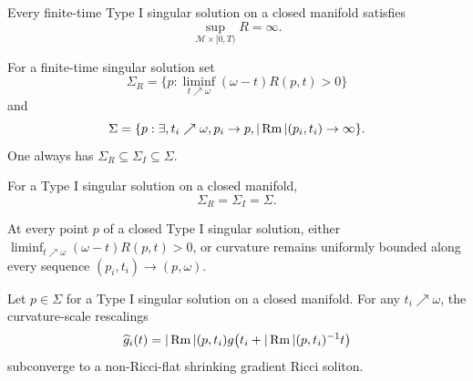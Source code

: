 \begin{theorem}
\label{thm:chow-iv-type-i-singular-scalar-curvature-unbounded}
Every finite-time Type I singular solution on a closed manifold satisfies
\[
 \sup_{\mathcal M\times[0,T)}R=\infty.
\]
\end{theorem}

\begin{definition}
\label{def:chow-iv-singular-point-sets}
For a finite-time singular solution set
\[
 \Sigma_R=\{p:\liminf_{t\nearrow\omega}(\omega-t)R(p,t)>0\}
\]
and
\[
 \Sigma=\{p:\exists,t_i\nearrow\omega, p_i\to p,
 |\operatorname{Rm}|(p_i,t_i)\to\infty\}.
\]
One always has \(\Sigma_R\subseteq\Sigma_I\subseteq\Sigma\).
\end{definition}

\begin{theorem}
\label{thm:chow-iv-type-i-singular-point-sets-equal}
For a Type I singular solution on a closed manifold,
\[
 \Sigma_R=\Sigma_I=\Sigma.
\]
\end{theorem}

\begin{corollary}
\label{cor:chow-iv-distinguish-type-i-singular-points}
At every point \(p\) of a closed Type I singular solution, either
\(\liminf_{t\nearrow\omega}(\omega-t)R(p,t)>0\), or curvature remains
uniformly bounded along every sequence \((p_i,t_i)\to(p,\omega)\).
\end{corollary}

\begin{theorem}
\label{thm:chow-iv-singular-point-curvature-scale-limits-nonflat}
Let \(p\in\Sigma\) for a Type I singular solution on a closed manifold.  For
any \(t_i\nearrow\omega\), the curvature-scale rescalings
\[
 \widehat g_i(t)=|\operatorname{Rm}|(p,t_i)
 g\bigl(t_i+|\operatorname{Rm}|(p,t_i)^{-1}t\bigr)
\]
subconverge to a non-Ricci-flat shrinking gradient Ricci soliton.
\end{theorem}


